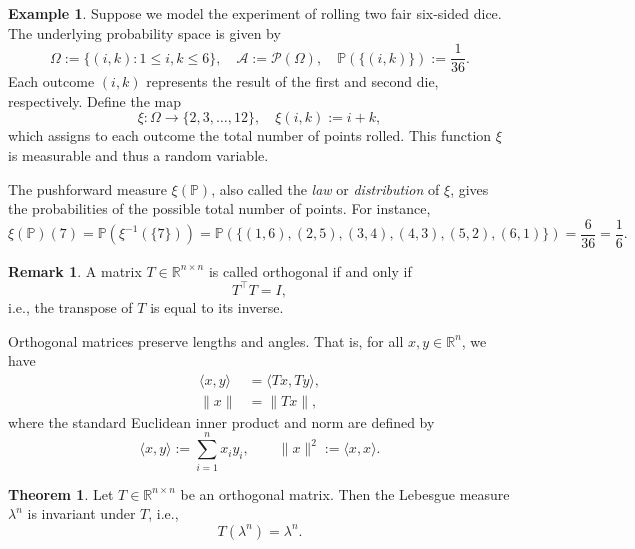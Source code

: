 \documentclass[12pt]{article}
\theoremstyle{definition}
\newtheorem{theorem}{Theorem}[section]
\newtheorem{example}{Example}[section]
\newtheorem{remark}{Remark}[section]
\begin{document}
\medskip
\begin{example}
Suppose we model the experiment of rolling two fair six-sided dice. The underlying probability space is given by
\[
\Omega := \{(i, k) : 1 \leq i, k \leq 6\}, \quad \mathcal{A} := \mathcal{P}(\Omega), \quad \mathbb{P}(\{(i, k)\}) := \frac{1}{36}.
\]
Each outcome \((i, k)\) represents the result of the first and second die, respectively. Define the map
\[
\xi : \Omega \to \{2, 3, \dots, 12\}, \quad \xi(i, k) := i + k,
\]
which assigns to each outcome the total number of points rolled. This function \( \xi \) is measurable and thus a random variable.

The pushforward measure \( \xi(\mathbb{P}) \), also called the \emph{law} or \emph{distribution} of \( \xi \), gives the probabilities of the possible total number of points. For instance,
\[
\xi(\mathbb{P})(7) = \mathbb{P}(\xi^{-1}(\{7\})) = \mathbb{P}(\{(1,6), (2,5), (3,4), (4,3), (5,2), (6,1)\}) = \frac{6}{36} = \frac{1}{6}.
\]
\end{example}

\medskip
\begin{remark}
A matrix \( T \in \mathbb{R}^{n \times n} \) is called orthogonal if and only if
\[
T^\top T = I,
\]
i.e., the transpose of \( T \) is equal to its inverse.

Orthogonal matrices preserve lengths and angles. That is, for all \( x, y \in \mathbb{R}^n \), we have
\begin{align*}
\langle x, y \rangle &= \langle Tx, Ty \rangle, \\
\|x\| &= \|Tx\|,
\end{align*}
where the standard Euclidean inner product and norm are defined by
\[
\langle x, y \rangle := \sum_{i=1}^n x_i y_i, \qquad \|x\|^2 := \langle x, x \rangle.
\]
\end{remark}

\medskip
\begin{theorem}
Let \( T \in \mathbb{R}^{n \times n} \) be an orthogonal matrix. Then the Lebesgue measure \( \lambda^n \) is invariant under \( T \), i.e.,
\[
T(\lambda^n) = \lambda^n.
\]
\end{theorem}
\end{document}
